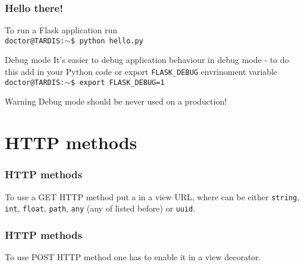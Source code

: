 \documentclass{beamer}
\newcommand{\bashcmd}[1]{\vspace{1mm}\hspace{5mm}\texttt{#1\\}\vspace{1mm}}
\begin{document}
\begin{frame}
  \frametitle{Hello there!}

  To run a Flask application run \\
  \bashcmd{doctor@TARDIS:$\sim$\$ python hello.py}

  \pause

  \begin{block}{Debug mode}
    It's easier to debug application behaviour in debug mode - to do this add 
    in your Python code or export \texttt{FLASK\_DEBUG} envrinoment variable \\
    \bashcmd{doctor@TARDIS:$\sim$\$ export FLASK\_DEBUG=1}
  \end{block}

  \pause

  \begin{block}{Warning}
    Debug mode should be never used on a production!
  \end{block}
\end{frame}

\section{HTTP methods}

\begin{frame}
  \frametitle{HTTP methods}

  To use a GET HTTP method put a  in a view URL, where  can be either \texttt{string},
  \texttt{int}, \texttt{float}, \texttt{path}, \texttt{any} (any of listed before) or \texttt{uuid}.

  \vspace{3mm}

  \begin{figure}
    \caption{}
  \end{figure}
\end{frame}

\begin{frame}
  \frametitle{HTTP methods}

  To use POST HTTP method one has to enable it in a view decorator.

  \vspace{3mm}

  \begin{figure}
    \caption{}
  \end{figure}

\end{frame}
\end{document}

